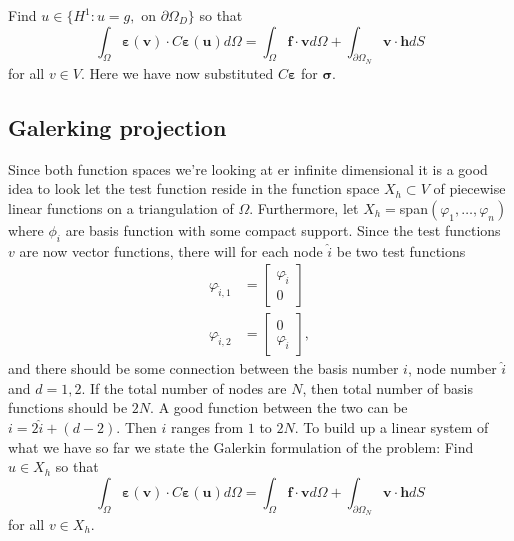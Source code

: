 \documentclass[paper=a4, fontsize=11pt]{scrartcl} %
\begin{document}
Find $u \in \{H^1 : u=g,$ on $\partial\Omega_D\}$ so that
\begin{equation}
\label{VarForm}
\int_{\Omega}\boldsymbol{\varepsilon}(\boldsymbol{v})\cdot C\boldsymbol{\varepsilon}(\boldsymbol{u})d\Omega = \int_{\Omega}\boldsymbol{f}\cdot \boldsymbol{v} d\Omega + \int_{\partial \Omega_N}\boldsymbol{v}\cdot\boldsymbol{h}dS
\end{equation}
for all $v\in V$. Here we have now substituted $C\boldsymbol{\varepsilon}$ for $\boldsymbol{\sigma}$.

\subsection*{Galerking projection}
Since both function spaces we're looking at er infinite dimensional it is a good idea to look let the test function reside in the function space $X_h \subset V$ of piecewise linear functions on a triangulation of $\Omega$. Furthermore, let $X_h =$span$(\varphi_1,\ldots,\varphi_n)$ where $\phi_i$ are basis function with some compact support. Since the test functions $v$ are now vector functions, there will for each node $\hat{i}$ be two test functions
\begin{align*}
\varphi_{\hat{i},1} &= \begin{bmatrix}
\varphi_{\hat{i}} \\ 0
\end{bmatrix} \\
\varphi_{\hat{i},2} &= \begin{bmatrix}
0 \\ \varphi_{\hat{i}}
\end{bmatrix},
\end{align*}
and there should be some connection between the basis number $i$, node number $\hat{i}$ and $d=1,2$. If the total number of nodes are $N$, then total number of basis functions should be $2N$. A good function between the two can be $i = 2\hat{i}+ (d-2)$. Then $i$ ranges from $1$ to $2N$. To build up a linear system of what we have so far we state the Galerkin formulation of the problem: Find $u \in X_h$ so that
\begin{equation}
\label{Galerkin}
\int_{\Omega}\boldsymbol{\varepsilon}(\boldsymbol{v})\cdot C\boldsymbol{\varepsilon}(\boldsymbol{u})d\Omega = \int_{\Omega}\boldsymbol{f}\cdot \boldsymbol{v} d\Omega + \int_{\partial \Omega_N}\boldsymbol{v}\cdot\boldsymbol{h}dS
\end{equation}
for all $v\in X_h$.
\end{document}
